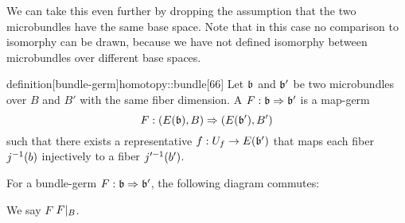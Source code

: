 \begin{myparagraph}
    We can take this even further by dropping the assumption
    that the two microbundles have the same base space.
    Note that in this case no comparison to isomorphy can be drawn,
    because we have not defined isomorphy between microbundles over different base spaces.
\end{myparagraph}

\begin{mystatement}{definition}[bundle-germ]{homotopy::bundle}[66]
    Let $\bb$ and $\bb'$ be two microbundles over $B$ and $B'$
    with the same fiber dimension.
    A  $\germdef{F}{\bb}{\bb'}$ is a map-germ
    \[ \germdef{F}{(E(\bb), B)}{(E(\bb'), B')} \]
    such that there exists a representative $f: U_f \to E(\bb')$
    that maps each fiber $j^{-1}(b)$ injectively to a fiber $j'^{-1}(b')$.
\end{mystatement}

\begin{myparagraph}
    For a bundle-germ $\germdef{F}{\bb}{\bb'}$, the following diagram commutes:
    \begin{center}
    \end{center}
    We say $F$  $F\vert_{B}$.
    
\end{myparagraph}